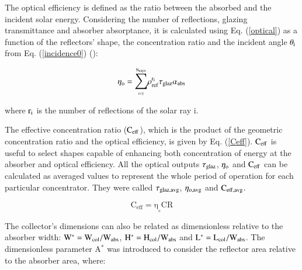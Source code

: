 %
%

The optical efficiency is defined as the ratio between the absorbed and the incident solar energy. Considering the number of reflections, glazing transmittance and absorber absorptance, it is calculated using Eq. (\ref{optical}) as a function of the reflectors' shape, the concentration ratio and the incident angle $\theta_{\rm i}$ from Eq. (\ref{incidence0}) (\cite{Sellami2013}):

\vspace{-0.75cm}
\begin{equation}
\mathrm{\eta_o = {\mathlarger{\sum\limits}_{\scriptscriptstyle i=1}^{\scriptscriptstyle \mathrm{N_{rays}}}{{\rho_{ref}^{{r_i}}}}}\tau_{glaz}\alpha_{abs}}
\label{optical}
\end{equation}

\noindent where $\rm{r_i}$ is the number of reflections of the solar ray i.

The effective concentration ratio ($\rm{C_{eff}}$), which is the product of the geometric concentration ratio and the optical efficiency, is given by Eq. (\ref{Ceff}). $\rm{C_{eff}}$ is useful to select shapes capable of enhancing both concentration of energy at the absorber and optical efficiency. All the optical outputs $\tau_{\rm {glaz}}$, $\eta_{\rm o}$ and $\rm{C_{eff}}$ can be calculated as averaged values to represent the whole period of operation for each particular concentrator. They were called $\tau_{\rm glaz,avg}$, $\eta_{\rm o,avg}$ and $\rm{C_{eff,avg}}$.

\vspace{-0.75cm}
\begin{equation}
\mathrm{C_{eff} = \eta_{\!_o}CR}
\label{Ceff}
\end{equation}

The collector's dimensions can also be related as dimensionless relative to the absorber width: $\rm{W^{*} = W_{col}/W_{abs}}$, $\rm{H^{*} = H_{col}/W_{abs}}$ and $\rm{L^{*} = L_{col}/W_{abs}}$. The dimensionless parameter A$^*$ was introduced to consider the reflector area relative to the absorber area, where:

